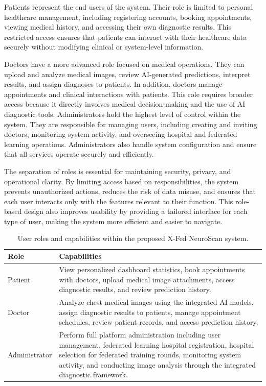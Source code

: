 Patients represent the end users of the system. Their role is limited to personal healthcare management, including registering accounts, booking appointments, viewing medical history, and accessing their own diagnostic results. This restricted access ensures that patients can interact with their healthcare data securely without modifying clinical or system-level information.

Doctors have a more advanced role focused on medical operations. They can upload and analyze medical images, review AI-generated predictions, interpret results, and assign diagnoses to patients. In addition, doctors manage appointments and clinical interactions with patients. This role requires broader access because it directly involves medical decision-making and the use of AI diagnostic tools.
Administrators hold the highest level of control within the system. They are responsible for managing users, including creating and inviting doctors, monitoring system activity, and overseeing hospital and federated learning operations. Administrators also handle system configuration and ensure that all services operate securely and efficiently.

The separation of roles is essential for maintaining security, privacy, and operational clarity. By limiting access based on responsibilities, the system prevents unauthorized actions, reduces the risk of data misuse, and ensures that each user interacts only with the features relevant to their function. This role-based design also improves usability by providing a tailored interface for each type of user, making the system more efficient and easier to navigate.

\begin{table}[htbp]
	\centering
	\caption{User roles and capabilities within the proposed X-Fed NeuroScan system.}
	\label{tab:user_roles_capabilities}
	\begin{tabular}{|p{3cm}|p{9.5cm}|}
		\hline
		\textbf{Role} & \textbf{Capabilities} \\
		\hline
		
		Patient &
		View personalized dashboard statistics, book appointments with doctors, upload medical image attachments, access diagnostic results, and review prediction history. \\
		\hline
		
		Doctor &
		Analyze chest medical images using the integrated AI models, assign diagnostic results to patients, manage appointment schedules, review patient records, and access prediction history. \\
		\hline
		
		Administrator &
		Perform full platform administration including user management, federated learning hospital registration, hospital selection for federated training rounds, monitoring system activity, and conducting image analysis through the integrated diagnostic framework. \\
		\hline
		
	\end{tabular}
\end{table}

